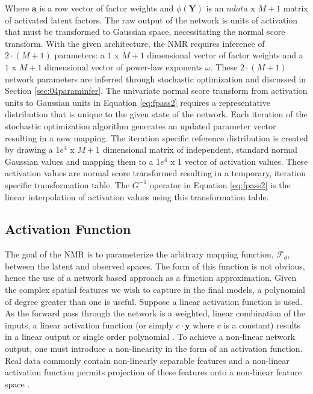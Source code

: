 Where $\mathbf{a}$ is a row vector of factor weights and $\phi\left(\mathbf{Y} \right)$ is an $ndata$ x $M+1$ matrix of activated latent factors. The raw output of the network is units of activation that must be transformed to Gaussian space, necessitating the normal score transform. With the given architecture, the \gls{NMR} requires inference of $2 \cdot (M+1)$ parameters: a $1$ x $M+1$ dimensional vector of factor weights and a $1$ x $M+1$ dimensional vector of power-law exponents $\omega$. These $2 \cdot (M+1)$ network parameters are inferred through stochastic optimization and discussed in Section \ref{sec:04paraminfer}. The univariate normal score transform from activation units to Gaussian units in Equation \ref{eq:fpass2} requires a representative distribution that is unique to the given state of the network. Each iteration of the stochastic optimization algorithm generates an updated parameter vector resulting in a new mapping. The iteration specific reference distribution is created by drawing a $1e^{4}$ x $M+1$ dimensional matrix of independent, standard normal Gaussian values and mapping them to a $1e^{4}$ x $1$ vector of activation values. These activation values are normal score transformed resulting in a temporary, iteration specific transformation table. The $G^{-1}$ operator in Equation \ref{eq:fpass2} is the linear interpolation of activation values using this transformation table.

\subsection{Activation Function}
\label{subsec:04activation}

The goal of the \gls{NMR} is to parameterize the arbitrary mapping function, $\mathcal{F}_{\theta}$, between the latent and observed spaces. The form of this function is not obvious, hence the use of a network based approach as a function approximation. Given the complex spatial features we wish to capture in the final models, a polynomial of degree greater than one is useful. Suppose a linear activation function is used. As the forward pass through the network is a weighted, linear combination of the inputs, a linear activation function (or simply $c \cdot \mathbf{y}$ where $c$ is a constant) results in a linear output or single order polynomial \citep{sharma2020activation}. To achieve a non-linear network output, one must introduce a non-linearity in the form of an activation function. Real data commonly contain non-linearly separable features and a non-linear activation function permits projection of these features onto a non-linear feature space \citep{dubey2022activation}.

